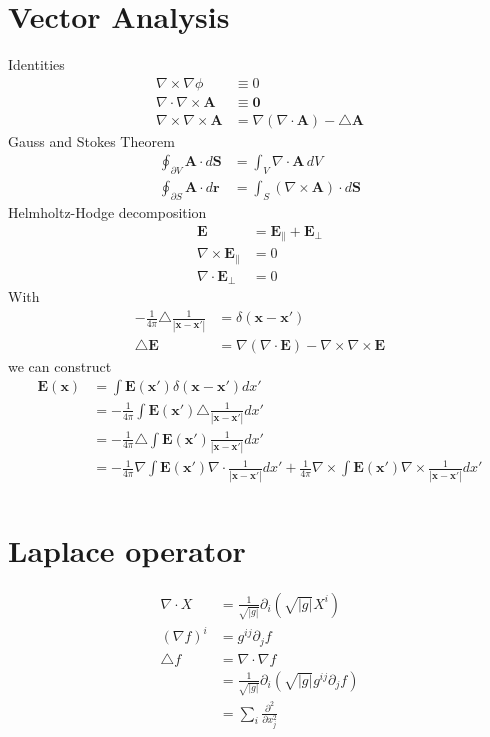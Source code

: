 \documentclass[../main.tex]{subfiles}
\begin{document}
\section{Vector Analysis}
Identities
\begin{align}
\nabla\times\nabla\phi&\equiv0\\
\nabla\cdot\nabla\times\mathbf{A}&\equiv\mathbf{0}\\
\nabla\times\nabla\times\mathbf{A}&=\nabla(\nabla\cdot\mathbf{A})-\triangle\mathbf{A}
\end{align}
Gauss and Stokes Theorem
\begin{align}
\oint_{\partial V}\mathbf{A}\cdot
d\mathbf{S}&=\int_V\nabla\cdot\mathbf{A}\,dV\\
\oint_{\partial S}\mathbf{A}\cdot
d\mathbf{r}&=\int_S(\nabla\times\mathbf{A})\cdot d\mathbf{S}
\end{align}
Helmholtz-Hodge decomposition
\begin{align}
\mathbf{E}&=\mathbf{E}_\parallel+\mathbf{E}_\perp\\
\nabla\times\mathbf{E}_\parallel&=0\\
\nabla\cdot\mathbf{E}_\perp&=0
\end{align}
With
\begin{align}
-\frac{1}{4\pi}\triangle\frac{1}{|\mathbf{x}-\mathbf{x}'|}&=\delta(\mathbf{x}-\mathbf{x}')\\
\triangle\mathbf{E}&=\nabla(\nabla\cdot\mathbf{E})-\nabla\times\nabla\times\mathbf{E}
\end{align}
we can construct
\begin{align}
\mathbf{E}(\mathbf{x})
&=\int \mathbf{E}(\mathbf{x}') \delta(\mathbf{x}-\mathbf{x}')dx'\\
&=-\frac{1}{4\pi}\int \mathbf{E}(\mathbf{x}')\triangle\frac{1}{|\mathbf{x}-\mathbf{x}'|}dx'\\
&=-\frac{1}{4\pi}\triangle\int \mathbf{E}(\mathbf{x}')\frac{1}{|\mathbf{x}-\mathbf{x}'|}dx'\\
&=-\frac{1}{4\pi}\nabla\int \mathbf{E}(\mathbf{x}')\nabla\cdot\frac{1}{|\mathbf{x}-\mathbf{x}'|}dx'+\frac{1}{4\pi}\nabla\times\int \mathbf{E}(\mathbf{x}')\nabla\times\frac{1}{|\mathbf{x}-\mathbf{x}'|}dx'\\
\end{align}

\section{Laplace operator}
\begin{align}
    \nabla\cdot X&=\frac{1}{\sqrt{|g|}}\partial_i\left(\sqrt{|g|}X^i\right)\\
    (\nabla f)^i&=g^{ij}\partial_jf\\
    \triangle f &= \nabla\cdot\nabla f\\
    &=\frac{1}{\sqrt{|g|}}\partial_i\left(\sqrt{|g|} g^{ij}\partial_jf \right)\\
    &= \sum_i \frac{\partial^2}{\partial x_j^2}
\end{align}
\end{document}
